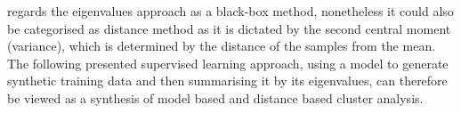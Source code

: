 \documentclass[a4paper, 11pt]{article}
\begin{document}
\cite{patterson2006population} regards the eigenvalues approach as a black-box method, nonetheless it could also be categorised as distance method as it is dictated by the second central moment (variance), which is determined by the distance of the samples from the mean. The following presented supervised learning approach, using a model to generate synthetic training data and then summarising it by its eigenvalues, can therefore be viewed as a synthesis of model based and distance based cluster analysis.

\end{document}
